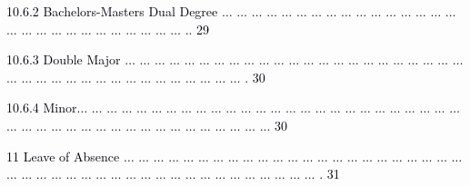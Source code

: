 \documentclass[12pt]{article}
\begin{document}
\vspace{\baselineskip}
\begin{adjustwidth}{0.5in}{0.0in}
{\fontsize{7pt}{8.4pt}\selectfont \textcolor[HTML]{00000A}{10.6.2 Bachelors-Masters Dual Degree $ \ldots $ $ \ldots $ $ \ldots $ $ \ldots $ $ \ldots $ $ \ldots $ $ \ldots $ $ \ldots $ $ \ldots $ $ \ldots $ $ \ldots $ $ \ldots $ $ \ldots $ $ \ldots $ $ \ldots $ $ \ldots $ $ \ldots $ $ \ldots $ $ \ldots $ $ \ldots $ $ \ldots $ $ \ldots $ $ \ldots $ $ \ldots $ $ \ldots $ $ \ldots $ $ \ldots $ $ \ldots $ .. 29}\par}\par

\end{adjustwidth}


\vspace{\baselineskip}
\begin{adjustwidth}{0.5in}{0.0in}
{\fontsize{7pt}{8.4pt}\selectfont \textcolor[HTML]{00000A}{10.6.3 Double Major $ \ldots $ $ \ldots $ $ \ldots $ $ \ldots $ $ \ldots $ $ \ldots $ $ \ldots $ $ \ldots $ $ \ldots $ $ \ldots $ $ \ldots $ $ \ldots $ $ \ldots $ $ \ldots $ $ \ldots $ $ \ldots $ $ \ldots $ $ \ldots $ $ \ldots $ $ \ldots $ $ \ldots $ $ \ldots $ $ \ldots $ $ \ldots $ $ \ldots $ $ \ldots $ $ \ldots $ $ \ldots $ $ \ldots $ $ \ldots $ $ \ldots $ $ \ldots $ $ \ldots $ $ \ldots $ $ \ldots $ $ \ldots $ $ \ldots $ $ \ldots $ $ \ldots $ . 30}\par}\par

\end{adjustwidth}


\vspace{\baselineskip}
\begin{adjustwidth}{0.5in}{0.0in}
{\fontsize{7pt}{8.4pt}\selectfont \textcolor[HTML]{00000A}{10.6.4 Minor$ \ldots $ $ \ldots $ $ \ldots $ $ \ldots $ $ \ldots $ $ \ldots $ $ \ldots $ $ \ldots $ $ \ldots $ $ \ldots $ $ \ldots $ $ \ldots $ $ \ldots $ $ \ldots $ $ \ldots $ $ \ldots $ $ \ldots $ $ \ldots $ $ \ldots $ $ \ldots $ $ \ldots $ $ \ldots $ $ \ldots $ $ \ldots $ $ \ldots $ $ \ldots $ $ \ldots $ $ \ldots $ $ \ldots $ $ \ldots $ $ \ldots $ $ \ldots $ $ \ldots $ $ \ldots $ $ \ldots $ $ \ldots $ $ \ldots $ $ \ldots $ $ \ldots $ $ \ldots $ $ \ldots $ $ \ldots $ $ \ldots $ $ \ldots $  30}\par}\par

\end{adjustwidth}


\vspace{\baselineskip}
{\fontsize{7pt}{8.4pt}\selectfont \textcolor[HTML]{00000A}{11 Leave of Absence $ \ldots $ $ \ldots $ $ \ldots $ $ \ldots $ $ \ldots $ $ \ldots $ $ \ldots $ $ \ldots $ $ \ldots $ $ \ldots $ $ \ldots $ $ \ldots $ $ \ldots $ $ \ldots $ $ \ldots $ $ \ldots $ $ \ldots $ $ \ldots $ $ \ldots $ $ \ldots $ $ \ldots $ $ \ldots $ $ \ldots $ $ \ldots $ $ \ldots $ $ \ldots $ $ \ldots $ $ \ldots $ $ \ldots $ $ \ldots $ $ \ldots $ $ \ldots $ $ \ldots $ $ \ldots $ $ \ldots $ $ \ldots $ $ \ldots $ $ \ldots $ $ \ldots $ $ \ldots $ $ \ldots $ $ \ldots $ $ \ldots $ $ \ldots $ . 31}\par}\par
\end{document}
